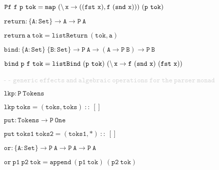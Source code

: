 \hspace{0.25cm}
{\small{$\mathtt{Pf ~ f ~ p ~ tok = map ~ (\char`\\ \,x \to ((fst ~x) , f~(snd ~x)))~ (p~ tok)}$}}

\vspace{0.25cm}

\hspace{0.25cm}
{\small{$\mathtt{return : \{A : Set\} \to A \to P~ A}$}}

\hspace{0.25cm}
{\small{$\mathtt{return ~a ~tok = listReturn ~(tok , a)}$}}

\vspace{0.25cm}

\hspace{0.25cm}
{\small{$\mathtt{bind : \{A : Set\} ~\{B : Set\} \to P ~A \to (A \to P ~B) \to P ~B}$}}

\hspace{0.25cm}
{\small{$\mathtt{bind ~p ~f ~tok = listBind ~(p ~tok) ~ (\char`\\ \,x \to f ~(snd ~x) ~(fst ~x))}$}}

\vspace{0.25cm}

\hspace{0.25cm}
{\small{\textcolor{lightgray}{- - $\mathtt{generic ~effects ~and ~algebraic ~operations ~for ~the ~parser ~monad}$}}}

\hspace{0.25cm}
{\small{$\mathtt{lkp : P ~Tokens}$}}

\hspace{0.25cm}
{\small{$\mathtt{lkp ~toks = (toks , toks) ~::~ []}$}}

\vspace{0.25cm}

\hspace{0.25cm}
{\small{$\mathtt{put : Tokens \to P ~ One}$}}

\hspace{0.25cm}
{\small{$\mathtt{put ~toks1 ~toks2 = (toks1 , *) ~::~ []}$}}

\vspace{0.25cm}

\hspace{0.25cm}
{\small{$\mathtt{or : \{A : Set\} \to P ~A \to P ~A \to P ~A}$}}

\hspace{0.25cm}
{\small{$\mathtt{or ~p1 ~p2 ~tok = append ~(p1 ~tok) ~(p2 ~tok)}$}}

\vspace{0.25cm}

